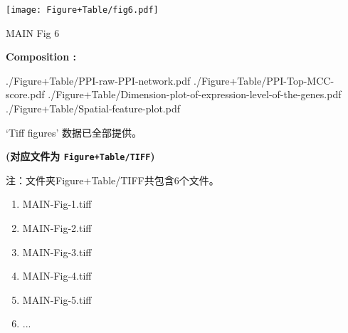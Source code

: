 \documentclass[
]{article}
\providecommand{\tightlist}{%
  \setlength{\itemsep}{0pt}\setlength{\parskip}{0pt}}
\begin{document}
\def\@captype{figure}
\begin{center}
\texttt{[image: Figure+Table/fig6.pdf]}
\caption{MAIN Fig 6}\label{fig:MAIN-Fig-6}
\end{center}
\begin{center}\begin{tcolorbox}[colback=gray!10, colframe=gray!50, width=0.9\linewidth, arc=1mm, boxrule=0.5pt]
\textbf{
Composition
:}

\vspace{0.5em}

    ./Figure+Table/PPI-raw-PPI-network.pdf \newline
./Figure+Table/PPI-Top-MCC-score.pdf \newline
./Figure+Table/Dimension-plot-of-expression-level-of-the-genes.pdf
\newline ./Figure+Table/Spatial-feature-plot.pdf

\vspace{2em}
\end{tcolorbox}
\end{center}

\begin{center}\vspace{1.5cm}\end{center}

\begin{center}\vspace{1.5cm}\end{center}

`Tiff figures' 数据已全部提供。

\textbf{(对应文件为 \texttt{Figure+Table/TIFF})}

\begin{center}\begin{tcolorbox}[colback=gray!10, colframe=gray!50, width=0.9\linewidth, arc=1mm, boxrule=0.5pt]注：文件夹Figure+Table/TIFF共包含6个文件。

\begin{enumerate}\tightlist
\item MAIN-Fig-1.tiff
\item MAIN-Fig-2.tiff
\item MAIN-Fig-3.tiff
\item MAIN-Fig-4.tiff
\item MAIN-Fig-5.tiff
\item ...
\end{enumerate}\end{tcolorbox}
\end{center}
\end{document}
